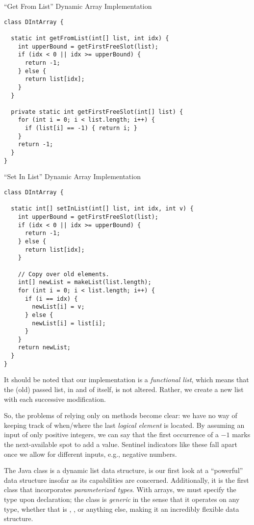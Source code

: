 \begin{cl}[]{``Get From List'' Dynamic Array Implementation}
\begin{lstlisting}[language=MyJava]
class DIntArray {

  static int getFromList(int[] list, int idx) {
    int upperBound = getFirstFreeSlot(list);
    if (idx < 0 || idx >= upperBound) {
      return -1;
    } else {
      return list[idx];
    }
  }

  private static int getFirstFreeSlot(int[] list) {
    for (int i = 0; i < list.length; i++) {
      if (list[i] == -1) { return i; }
    }
    return -1;
  }
}
\end{lstlisting}
\end{cl}

\begin{cl}[]{``Set In List'' Dynamic Array Implementation}
\begin{lstlisting}[language=MyJava]
class DIntArray {

  static int[] setInList(int[] list, int idx, int v) {
    int upperBound = getFirstFreeSlot(list);
    if (idx < 0 || idx >= upperBound) {
      return -1;
    } else {
      return list[idx];
    }

    // Copy over old elements.
    int[] newList = makeList(list.length);
    for (int i = 0; i < list.length; i++) {
      if (i == idx) {
        newList[i] = v;
      } else {
        newList[i] = list[i];
      }
    }
    return newList;
  }
}
\end{lstlisting}
\end{cl}

It should be noted that our implementation is a \textit{functional list}, which means that the (old) passed list, in and of itself, is not altered. Rather, we create a new list with each successive modification.

So, the problems of relying only on methods become clear: we have no way of keeping track of when/where the last \textit{logical element} is located. By assuming an input of only positive integers, we can say that the first occurrence of a $-1$ marks the next-available spot to add a value. Sentinel indicators like these fall apart once we allow for different inputs, e.g., negative numbers. 

The Java  class is a dynamic list data structure, is our first look at a ``powerful'' data structure insofar as its capabilities are concerned. Additionally, it is the first class that incorporates \textit{parameterized types}. With arrays, we must specify the type upon declaration; the  class is \textit{generic} in the sense that it operates on any type, whether that is , , or anything else, making it an incredibly flexible data structure. 

